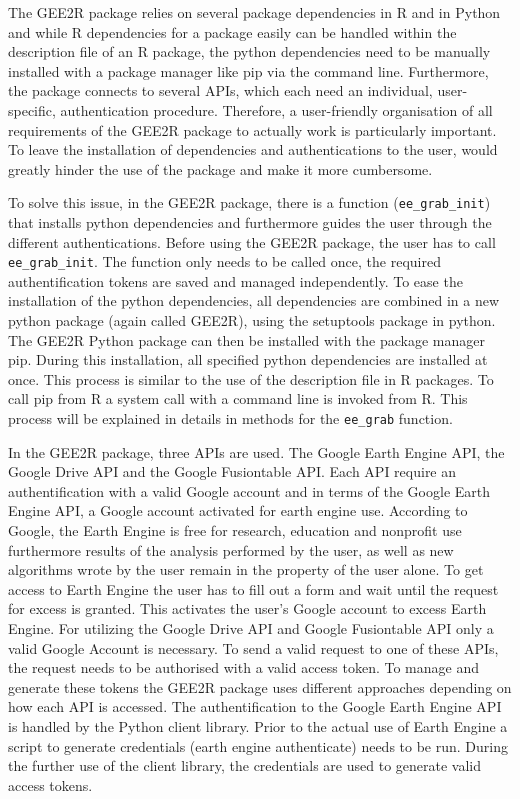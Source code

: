 The GEE2R package relies on several package dependencies in R and in Python and while R dependencies for a package easily can be handled within the description file of an R package, the python dependencies need to be manually installed with a package manager like pip via the command line. Furthermore, the package connects to several APIs, which each need an individual, user-specific, authentication procedure. Therefore, a user-friendly organisation of all requirements of the GEE2R package to actually work is particularly important. To leave the installation of dependencies and authentications to the user, would greatly hinder the use of the package and make it more cumbersome. 

To solve this issue, in the GEE2R package, there is a function (\texttt{ee\_grab\_init}) that installs python dependencies and furthermore guides the user through the different authentications. Before using the GEE2R package, the user has to call \texttt{ee\_grab\_init}. The function only needs to be called once, the required authentification tokens are saved and managed independently. 
To ease the installation of the python dependencies, all dependencies are combined in a new python package (again called GEE2R), using the setuptools package in python. The GEE2R Python package can then be installed with the package manager pip. During this installation, all specified python dependencies are installed at once. This process is similar to the use of the description file in R packages. To call pip from R a system call with a command line is invoked from R. This process will be explained in details in methods for the \texttt{ee\_grab} function. 

In the GEE2R package, three APIs are used. The Google Earth Engine API, the Google Drive API and the Google Fusiontable API. Each API require an authentification with a valid Google account and in terms of the Google Earth Engine API, a Google account activated for earth engine use. According to Google, the Earth Engine is free for research, education and nonprofit use furthermore results of the analysis performed by the user, as well as new algorithms wrote by the user remain in the property of the user alone.
To get access to Earth Engine the user has to fill out a form and wait until the request for excess is granted. This activates the user's Google account to excess Earth Engine. For utilizing the Google Drive API and Google Fusiontable API only a valid Google Account is necessary. To send a valid request to one of these APIs, the request needs to be authorised with a valid access token. To manage and generate these tokens the GEE2R package uses different approaches depending on how each API is accessed. The authentification to the Google Earth Engine API is handled by the Python client library. Prior to the actual use of Earth Engine a script to generate credentials (earth engine authenticate) needs to be run. During the further use of the client library, the credentials are used to generate valid access tokens.

